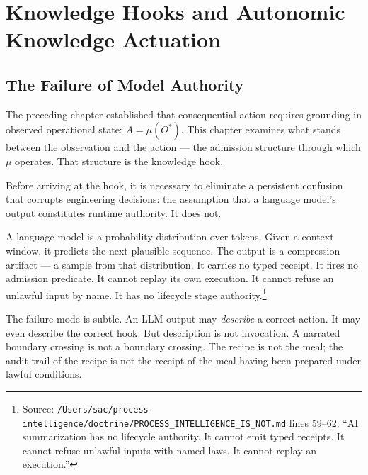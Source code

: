 \chapter{Knowledge Hooks and Autonomic Knowledge Actuation}
\label{chap:knowledge-hooks-aka}


\section{The Failure of Model Authority}
\label{sec:hooks-model-authority-failure}

The preceding chapter established that consequential action requires grounding in observed
operational state: $A = \mu(O^{*})$. This chapter examines what stands between the observation
and the action --- the admission structure through which $\mu$ operates. That structure is the
knowledge hook.

Before arriving at the hook, it is necessary to eliminate a persistent confusion that corrupts
engineering decisions: the assumption that a language model's output constitutes runtime
authority. It does not.

A language model is a probability distribution over tokens. Given a context window, it predicts
the next plausible sequence. The output is a compression artifact --- a sample from that
distribution. It carries no typed receipt. It fires no admission predicate. It cannot replay its
own execution. It cannot refuse an unlawful input by name. It has no lifecycle stage
authority.\footnote{Source:
\texttt{/Users/sac/process-intelligence/doctrine/PROCESS\_INTELLIGENCE\_IS\_NOT.md} lines 59--62:
``AI summarization has no lifecycle authority. It cannot emit typed receipts. It cannot refuse
unlawful inputs with named laws. It cannot replay an execution.''}

The failure mode is subtle. An LLM output may \emph{describe} a correct action. It may even
describe the correct hook. But description is not invocation. A narrated boundary crossing is
not a boundary crossing. The recipe is not the meal; the audit trail of the recipe is not the
receipt of the meal having been prepared under lawful conditions.

